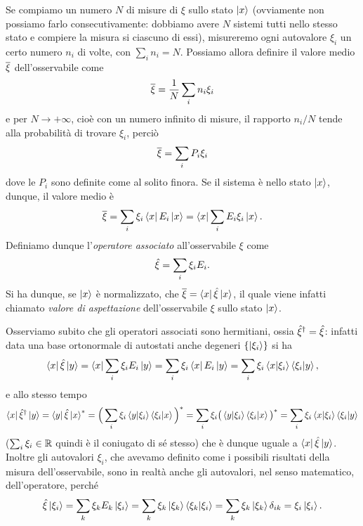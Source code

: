 Se compiamo un numero $N$ di misure di $\xi$ sullo stato $\left|{x}\right\rangle$ (ovviamente non possiamo farlo consecutivamente: dobbiamo avere $N$ sistemi tutti nello stesso stato e compiere la misura si ciascuno di essi), misureremo ogni autovalore $\xi_i$ un certo numero $n_i$ di volte, con $\sum_in_i=N$.
Possiamo allora definire il valore medio $\overline{\xi}$ dell'osservabile come
\begin{equation}
	\overline{\xi}=\frac1{N}\sum_in_i\xi_i
	\label{eq:valore-medio-finito}
\end{equation}
e per $N\to+\infty$, cioè con un numero infinito di misure, il rapporto $n_i/N$ tende alla probabilità di trovare $\xi_i$, perciò
\begin{equation}
	\overline{\xi}=\sum_iP_i\xi_i
	\label{eq:valore-medio}
\end{equation}
dove le $P_i$ sono definite come al solito finora.
Se il sistema è nello stato $\left|{x}\right\rangle$, dunque, il valore medio è
\begin{equation}
	\overline{\xi}=\sum_i\xi_i\left\langle{x}\right|E_i\left|{x}\right\rangle=\left\langle{x}\right|\sum_iE_i\xi_i\left|{x}\right\rangle.
\end{equation}
Definiamo dunque l'\emph{operatore associato} all'osservabile $\xi$ come
\begin{equation}
	\hat{\xi}=\sum_i\xi_iE_i.
	\label{eq:definizione-operatore}
\end{equation}
Si ha dunque, se $\left|{x}\right\rangle$ è normalizzato, che $\overline{\xi}=\left\langle{x}\right|\hat{\xi}\left|{x}\right\rangle$, il quale viene infatti chiamato \emph{valore di aspettazione} dell'osservabile $\xi$ sullo stato $\left|{x}\right\rangle$.

Osserviamo subito che gli operatori associati sono hermitiani, ossia ${\hat{\xi}}^\dagger=\hat{\xi}$: infatti data una base ortonormale di autostati anche degeneri $\{\left|{\xi_i}\right\rangle\}$ si ha
\begin{equation}
	\left\langle{x}\right|\hat{\xi}\left|{y}\right\rangle=\left\langle{x}\right|\sum_i\xi_iE_i\left|{y}\right\rangle=\sum_i\xi_i\left\langle{x}\right|E_i\left|{y}\right\rangle=\sum_i\xi_i\left\langle{x}\middle|{\xi_i}\right\rangle\left\langle{\xi_i}\middle|{y}\right\rangle,
\end{equation}
e allo stesso tempo
\begin{equation}
	\left\langle{x}\right|{\hat{\xi}}^\dagger\left|{y}\right\rangle=\left\langle{y}\right|\hat{\xi}\left|{x}\right\rangle^*=\Big(\sum_i\xi_i\left\langle{y}\middle|{\xi_i}\right\rangle\left\langle{\xi_i}\middle|{x}\right\rangle\Big)^*=\sum_i\xi_i\big(\left\langle{y}\middle|{\xi_i}\right\rangle\left\langle{\xi_i}\middle|{x}\right\rangle\big)^*=\sum_i\xi_i\left\langle{x}\middle|{\xi_i}\right\rangle\left\langle{\xi_i}\middle|{y}\right\rangle
\end{equation}
($\sum_i\xi_i\in\mathbb{R}$ quindi è il coniugato di s\'e stesso) che è dunque uguale a $\left\langle{x}\right|\hat{\xi}\left|{y}\right\rangle$.
Inoltre gli autovalori $\xi_i$, che avevamo definito come i possibili risultati della misura dell'osservabile, sono in realtà anche gli autovalori, nel senso matematico, dell'operatore, perch\'e
\begin{equation}
	\hat{\xi}\left|{\xi_i}\right\rangle=\sum_k\xi_kE_k\left|{\xi_i}\right\rangle=\sum_k\xi_k\left|{\xi_k}\right\rangle\left\langle{\xi_k}\middle|{\xi_i}\right\rangle=\sum_k\xi_k\left|{\xi_k}\right\rangle\delta_{ik}=\xi_i\left|{\xi_i}\right\rangle.
\end{equation}

